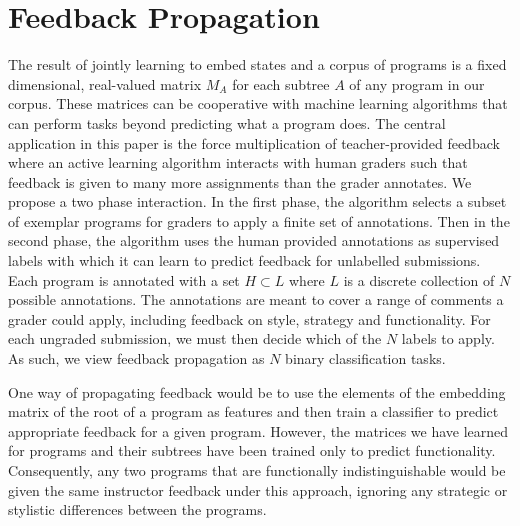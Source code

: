 \section{Feedback Propagation}\label{sec:feedback}
The result of jointly learning to embed states and 
a corpus of programs is a fixed dimensional, real-valued matrix $M_A$ for each subtree $A$ of any program in our corpus. These matrices can be cooperative with machine learning algorithms that can perform tasks beyond predicting what a program does. 
The central application in this paper is the force multiplication of teacher-provided feedback where an active learning algorithm interacts with human graders such that feedback is given to many more assignments than the grader annotates. We propose a two phase interaction. In the first phase, the algorithm selects a subset of exemplar programs for graders to apply a finite set of annotations. Then in the second phase, the algorithm uses the human provided annotations as supervised labels with which it can learn to predict feedback for unlabelled submissions. Each program is annotated with a set $H \subset L$ where $L$ is a discrete collection of $N$ possible annotations. The annotations are meant to cover a range of comments a grader could apply, including feedback on style, strategy and functionality. For each ungraded submission, we must then decide which of the $N$ labels to apply. As such, we view feedback propagation as $N$ binary classification tasks. 

One way of propagating feedback would be to use the elements of the embedding matrix of the root of a program as features and then train a classifier to predict appropriate feedback for a given program.  However, the matrices we have learned for programs and their subtrees have been trained only to predict functionality.  Consequently, any two programs that are functionally indistinguishable would be given the same instructor feedback under this approach, ignoring any strategic or stylistic differences between the programs.


